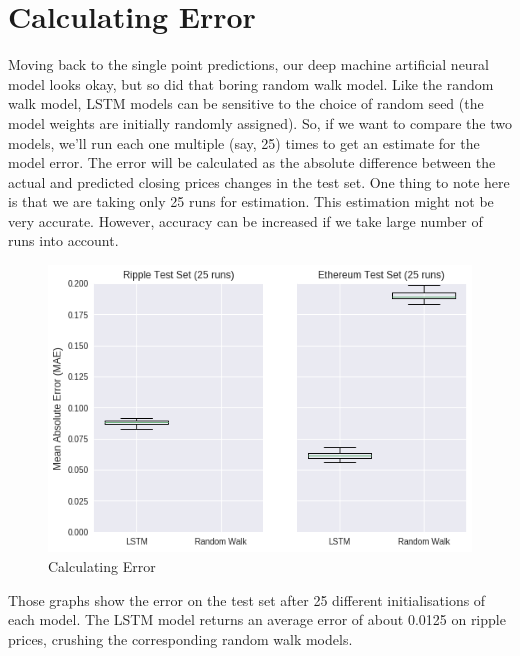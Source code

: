 \section{Calculating Error}
Moving back to the single point predictions, our deep machine artificial neural model looks okay, but so did that boring random walk model. Like the random walk model, LSTM models can be sensitive to the choice of random seed (the model weights are initially randomly assigned). So, if we want to compare the two models, we'll run each one multiple (say, 25) times to get an estimate for the model error. The error will be calculated as the absolute difference between the actual and predicted closing prices changes in the test set. One thing to note here is that we are taking only 25 runs for estimation. This estimation might not be very accurate. However, accuracy can be increased if we take large number of runs into account.
\begin{figure}[h]
    \centering \includegraphics[scale=0.7]{images/error.png}
    \caption{Calculating Error}
\end{figure}
 Those graphs show the error on the test set after 25 different initialisations of each model. The LSTM model returns an average error of about 0.0125 on ripple prices, crushing the corresponding random walk models.
